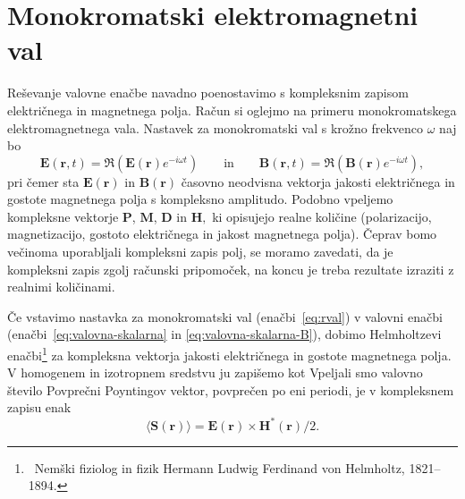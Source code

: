 \section{Monokromatski elektromagnetni val}
Reševanje valovne enačbe navadno poenostavimo s kompleksnim
zapisom električnega in magnetnega polja. Račun si
oglejmo na primeru monokromatskega elektromagnetnega vala. Nastavek
za monokromatski val s krožno frekvenco $\omega$ naj bo
\begin{equation}
\mathbf{E}(\mathbf{r},t)  =\mathfrak{\Re}(\mathbf{E}(\mathbf{r})e^{-i\omega t})\qquad \textrm{in} \qquad
\mathbf{B}(\mathbf{r},t)  =\mathfrak{\Re}(\mathbf{B}(\mathbf{r})e^{-i\omega t}),
\label{eq:rval}
\end{equation}
pri čemer sta $\mathbf E(\mathbf{r})$ in $\mathbf B(\mathbf{r})$ časovno
neodvisna vektorja jakosti električnega in gostote
magnetnega polja s kompleksno
amplitudo. Podobno vpeljemo kompleksne vektorje $\mathbf{P}$,
$\mathbf{M}$, $\mathbf{D}$ in $\mathbf{H},$ ki opisujejo realne količine (polarizacijo,
magnetizacijo, gostoto električnega in jakost magnetnega polja).
Čeprav bomo večinoma uporabljali kompleksni zapis polj, se moramo zavedati, da
je kompleksni zapis zgolj računski pripomoček, na koncu
je treba rezultate izraziti z realnimi količinami. 

Če vstavimo nastavka za monokromatski val (enačbi~\ref{eq:rval}) v valovni enačbi
(enačbi~\ref{eq:valovna-skalarna} in \ref{eq:valovna-skalarna-B}), 
dobimo Helmholtzevi
enačbi\footnote{~Nemški fiziolog in fizik Hermann Ludwig Ferdinand von Helmholtz, 1821--1894.} 
za kompleksna vektorja jakosti električnega in gostote magnetnega polja.
V homogenem in izotropnem sredstvu ju zapišemo kot
Vpeljali smo valovno število
Povprečni Poyntingov vektor, povprečen
po eni periodi, je v kompleksnem zapisu enak
\begin{equation}
\langle\mathbf{S}(\mathbf{r})\rangle=\mathbf{E}(\mathbf{r})\times\mathbf{H}^{*}(\mathbf{r})/2.
\label{eq:Poyntingov-vektor-c}
\end{equation}

